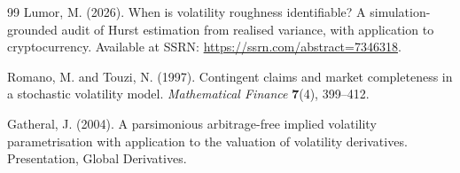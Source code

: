 \documentclass[11pt]{article}
\begin{document}
\begin{thebibliography}{99}
 Lumor, M. (2026).
When is volatility roughness identifiable? A simulation-grounded audit of Hurst
estimation from realised variance, with application to cryptocurrency. Available at
SSRN: \url{https://ssrn.com/abstract=7346318}.

 Romano, M. and Touzi, N. (1997).
Contingent claims and market completeness in a stochastic volatility model.
\emph{Mathematical Finance} \textbf{7}(4), 399--412.

 Gatheral, J. (2004).
A parsimonious arbitrage-free implied volatility parametrisation with application to
the valuation of volatility derivatives. Presentation, Global Derivatives.

\end{thebibliography}
\end{document}
